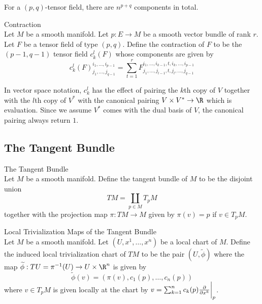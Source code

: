 \documentclass[a4paper]{article}
\begin{document}
For a $(p,q)$-tensor field, there are $n^{p+q}$ components in total. 

\begin{defn}{Contraction}{}\\
Let $M$ be a smooth manifold. Let $p:E\to M$ be a smooth vector bundle of rank $r$. Let $F$ be a tensor field of type $(p,q)$. Define the contraction of $F$ to be the $(p-1,q-1)$ tensor field $c_k^l(F)$ whose components are given by $$c_k^l(F)^{i_1,\dots,i_{p-1}}_{j_1,\dots,j_{q-1}}=\sum_{t=1}^rF^{i_1,\dots,i_{k-1},t,i_k,\dots,i_{p-1}}_{j_1,\dots,j_{l-1},t,j_l,\dots,j_{q-1}}$$
\end{defn}

In vector space notation, $c_k^l$ has the effect of pairing the $k$th copy of $V$ together with the $l$th copy of $V^\ast$ with the canonical pairing $V\times V^\ast\to\R$ which is evaluation. Since we assume $V^\ast$ comes with the dual basis of $V$, the canonical pairing always return $1$. 

\subsection{The Tangent Bundle}
\begin{defn}{The Tangent Bundle}{}\\
Let $M$ be a smooth manifold. Define the tangent bundle of $M$ to be the disjoint union $$TM=\coprod_{p\in M}T_pM$$ together with the projection map $\pi:TM\to M$ given by $\pi(v)=p$ if $v\in T_pM$. 
\end{defn}

\begin{defn}{Local Trivialization Maps of the Tangent Bundle}{}\\
Let $M$ be a smooth manifold. Let $(U,x^1,\dots,x^n)$ be a local chart of $M$. Define the induced local trivialization chart of $TM$ to be the pair $(U,\widetilde{\phi})$ where the map $\widetilde{\phi}:TU=\pi^{-1}(U)\to U\times\R^n$ is given by $$\widetilde{\phi}(v)=(\pi(v),c_1(p),\dots,c_n(p))$$ where $v\in T_pM$ is given locally at the chart by $v=\sum_{k=1}^nc_k(p)\frac{\partial}{\partial x^k}\bigg{|}_p$. 
\end{defn}
\end{document}
